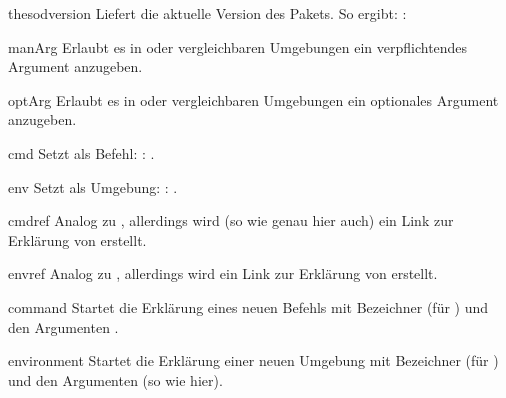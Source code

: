 \documentclass{sopra-base}
\begin{document}
\begin{command}{thesodversion}{}
    Liefert die aktuelle Version des Pakets. So ergibt: : \thesodversion\\
\end{command}

\begin{command}{manArg}{}
    Erlaubt es in  oder vergleichbaren Umgebungen ein verpflichtendes Argument anzugeben. 
\end{command}

\begin{command}{optArg}{}
    Erlaubt es in  oder vergleichbaren Umgebungen ein optionales Argument anzugeben.
\end{command}

\begin{command}{cmd}{}
    Setzt  als Befehl: : .
\end{command}

\begin{command}{env}{}
    Setzt  als Umgebung: : .
\end{command}

\begin{command}{cmdref}{}
    Analog zu , allerdings wird (so wie genau hier auch) ein Link zur Erklärung von  erstellt.
\end{command}

\begin{command}{envref}{}
    Analog zu , allerdings wird ein Link zur Erklärung von  erstellt.
\end{command}

\begin{environment}{command}{}
    Startet die Erklärung eines neuen Befehls mit Bezeichner  (für ) und den Argumenten .
\end{environment}

\begin{environment}{environment}{}
    Startet die Erklärung einer neuen Umgebung mit Bezeichner  (für ) und den Argumenten  (so wie hier).
\end{environment}
\end{document}
